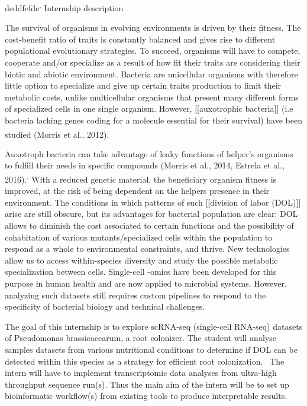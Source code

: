\documentclass[
  11pt,
  a4paper,
]{report}
\begin{document}
deddfefde\textsuperscript{,}
Internship description

The survival of organisms in evolving environments is driven by their
fitness. The cost-benefit ratio of traits is constantly balanced and
gives rise to different populational evolutionary strategies. To
succeed, organisms will have to compete, cooperate and/or specialize as
a result of how fit their traits are considering their biotic and
abiotic environment. Bacteria are unicellular organisms with therefore
little option to specialize and give up certain traits production to
limit their metabolic costs, unlike multicellular organisms that present
many different forms of specialized cells in one single organism.
However, {[}{[}auxotrophic bacteria{]}{]} (i.e bacteria lacking genes
coding for a molecule essential for their survival) have been studied
(Morris et al., 2012).\textsuperscript{}

Auxotroph bacteria can take advantage of leaky functions of helper's
organisms to fulfill their needs in specific compounds (Morris et al.,
2014, Estrela et al.,
2016).\textsuperscript{,}
With a reduced genetic material, the beneficiary organism fitness is
improved, at the risk of being dependent on the helpers presence in
their environment. The conditions in which patterns of such
{[}{[}division of labor (DOL){]}{]} arise are still obscure, but its
advantages for bacterial population are clear: DOL allows to diminish
the cost associated to certain functions and the possibility of
cohabitation of various mutants/specialized cells within the population
to respond as a whole to environmental constraints, and thrive. New
technologies allow us to access within-species diversity and study the
possible metabolic specialization between cells. Single-cell -omics have
been developed for this purpose in human health and are now applied to
microbial systems. However, analyzing such datasets still requires
custom pipelines to respond to the specificity of bacterial biology and
technical challenges.

The goal of this internship is to explore scRNA-seq (single-cell
RNA-seq) datasets of Pseudomonas brassicacearum, a root colonizer. The
student will analyse samples datasets from various nutritional
conditions to determine if DOL can be detected within this species as a
strategy for efficient root colonization.~ The intern will have to
implement transcriptomic data analyses from ultra-high throughput
sequence run(s). Thus the main aim of the intern will be to set up
bioinformatic workflow(s) from existing tools to produce interpretable
results.
\end{document}
